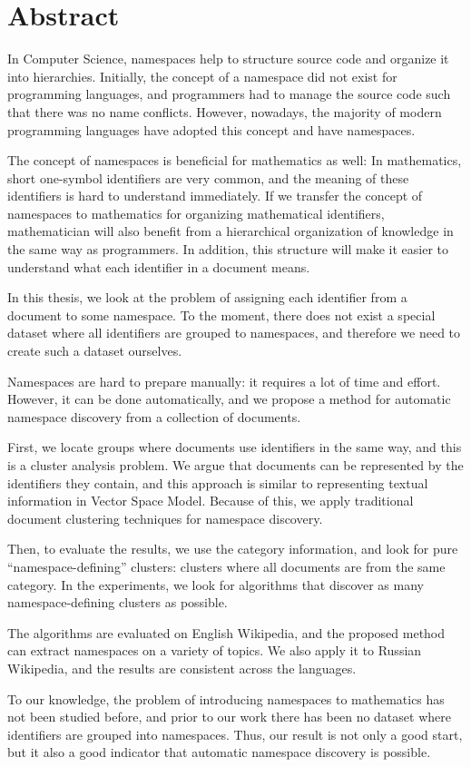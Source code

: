 \section*{Abstract}

In Computer Science, namespaces help to structure source code and
organize it into hierarchies. Initially, the concept of a namespace did not 
exist for programming languages, and programmers had to manage the source code
such that there was no name conflicts. However, nowadays, the majority 
of modern programming languages have adopted this concept and have namespaces. 

The concept of namespaces is beneficial for mathematics as well: 
In mathematics, short one-symbol identifiers are very common, 
and the meaning of these identifiers is hard to understand immediately. 
If we transfer the concept of namespaces to mathematics for organizing mathematical identifiers, 
mathematician will also benefit from a hierarchical organization of 
knowledge in the same way as programmers. In addition, this structure 
will make it easier to understand what each identifier in a document means.


In this thesis, we look at the problem of assigning each identifier from a document 
to some namespace. To the moment, there does not exist a special dataset where 
all identifiers are grouped to namespaces, and therefore we need to create 
such a dataset ourselves.


Namespaces are hard to prepare manually: it requires a lot of time and effort. 
However, it can be done automatically, and we propose 
a method for automatic namespace discovery from a collection of documents. 

First, we locate groups where documents use identifiers in the same way, and this 
is a cluster analysis problem.
We argue that documents can be represented by the identifiers they contain, and this 
approach is similar to representing textual information in Vector Space Model.
Because of this, we apply traditional document clustering techniques for namespace 
discovery.

Then, to evaluate the results, we use the category information, and look for pure 
``namespace-defining'' clusters: clusters where all documents are from the same category. 
In the experiments, we look for algorithms that discover as many namespace-defining 
clusters as possible.

The algorithms are evaluated on English Wikipedia, and the proposed method 
can extract namespaces on a variety of topics. 
We also apply it to Russian Wikipedia, and the results are consistent across 
the languages.

To our knowledge, the problem of introducing namespaces to mathematics has not
been studied before, and prior to our work there has been no dataset where identifiers 
are grouped into namespaces. Thus, our result is not only a good start, 
but it also a good indicator that automatic namespace discovery is possible. 